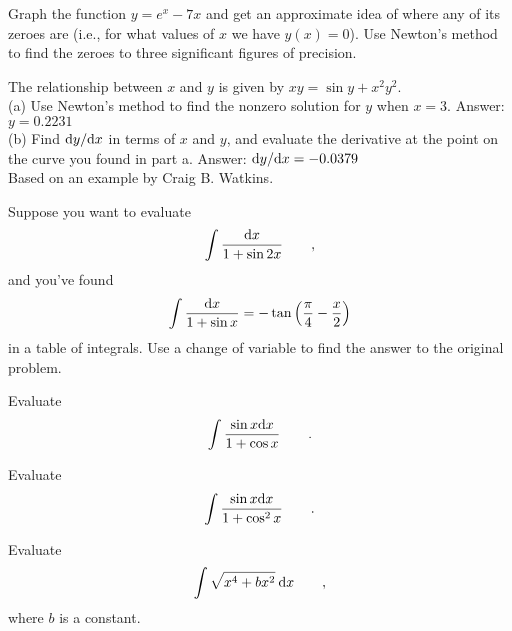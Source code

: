 
\begin{hwsection}
\begin{hw}
Graph the function $y=e^x-7x$ and get an approximate idea of where any of its zeroes
are (i.e., for what values of $x$ we have $y(x)=0$).
Use Newton's method to find the zeroes to three significant figures of precision.
\end{hw}

\begin{hw}
The relationship between $x$ and $y$ is given by $xy = \sin y+x^2y^2$.\\
(a) Use Newton's method to find the nonzero solution for $y$ when $x=3$. Answer: $y=0.2231$\\
(b) Find $\textup{d} y/\textup{d} x$ in terms of $x$ and $y$, and evaluate the derivative
at the point on the curve you found in part a. Answer: $\textup{d} y/\textup{d} x=-0.0379$\\
{\footnotesize Based on an example by Craig B. Watkins.}
\end{hw}

\begin{hw}
Suppose you want to evaluate
\begin{equation*}
  \int \frac{\textup{d} x}{1+\sin 2x} \qquad ,
\end{equation*}
and you've found
\begin{equation*}
  \int \frac{\textup{d} x}{1+\sin x} = -\tan\left(\frac{\pi}{4}-\frac{x}{2}\right)
\end{equation*}
in a table of integrals. Use a change of variable to find the answer to the
original problem.
\end{hw}

\begin{hw}
Evaluate
\begin{equation*}
  \int \frac{\sin x \textup{d} x}{1+\cos x} \qquad .
\end{equation*}
\end{hw}

\begin{hw}
Evaluate
\begin{equation*}
  \int \frac{\sin x \textup{d} x}{1+\cos^2 x} \qquad .
\end{equation*}
\end{hw}

\begin{hw}
Evaluate
\begin{equation*}
  \int \sqrt{x^4+bx^2} \:\textup{d} x \qquad ,
\end{equation*}
where $b$ is a constant.
\end{hw}


\end{hwsection}
